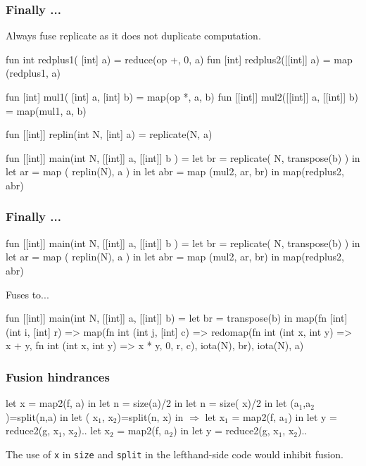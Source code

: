 \documentclass{beamer}
\renewcommand{\emph}[1]{\textcolor{structure}{#1}}
\newcommand{\emp}[1]{\textcolor{DikuRed}{ #1}}
\newcommand{\emphh}[1]{\textcolor{CosGreen}{ #1}}
\newcommand{\mymath}[1]{$ #1 $}
\newcommand{\myindx}[1]{_{#1}}
\begin{document}
\begin{frame}[fragile,t]
  \frametitle{Finally ... }

  Always fuse \emph{replicate} as it does not duplicate computation.

  \bigskip

\begin{colorcode}
fun   int    redplus1( [int]  a) = reduce(op +, 0, a)
fun  [int]   redplus2([[int]] a) = map   (redplus1, a)

fun  [int]   mul1( [int]  a,  [int]  b) = map(op *, a, b)
fun [[int]]  mul2([[int]] a, [[int]] b) = map(mul1, a, b)

fun [[int]]  replin(int N, [int] a) = replicate(N, a)

fun [[int]] main(int N, [[int]] a, [[int]] b ) =
    let br  = replicate( N, transpose(b) ) in
    let ar  = map      ( replin(N),    a ) in
    let abr = map  (mul2, ar, br)          in
        map(redplus2, abr)
\end{colorcode}
\end{frame}

\begin{frame}[fragile,t]
  \frametitle{Finally ... }

\begin{colorcode}
fun [[int]] main(int N, [[int]] a, [[int]] b ) =
    let br  = replicate( N, transpose(b) ) in
    let ar  = map      ( replin(N),    a ) in
    let abr = map  (mul2, ar, br)      in
        map(redplus2, abr)
\end{colorcode}

Fuses to...

\begin{colorcode}
fun [[int]] main(int N, [[int]] a, [[int]] b) =
  let br = transpose(b) in
  map(fn [int] (int i, [int] r) =>
      map(fn int (int j, [int] c) =>
          redomap(fn int (int x, int y) => x + y,
                  fn int (int x, int y) => x * y,
                  0, r, c),
          iota(N), br),
      iota(N), a)
\end{colorcode}

\end{frame}

\begin{frame}[fragile, t]
\frametitle{Fusion hindrances}

\begin{colorcode}
let \emphh{x} = map2(f, a)      in    let n = size(a)/2      in
let n = size(\emp{x})/2       in    let (a\mymath{\myindx{1}},a\mymath{\myindx{2}})=split(n,a) in
let (\emphh{x\mymath{\myindx{1}}},\emphh{x\mymath{\myindx{2}}})=split(n,\emp{x})  in \mymath{\Rightarrow} let \emphh{x\mymath{\myindx{1}}} = map2(f, a\mymath{\myindx{1}})   in
let y = reduce2(g,\emphh{x\mymath{\myindx{1}}},\emphh{x\mymath{\myindx{2}}})..    let \emphh{x\mymath{\myindx{2}}} = map2(f, a\mymath{\myindx{2}})   in
                              let y = reduce2(g,\emphh{x\mymath{\myindx{1}}},\emphh{x\mymath{\myindx{2}}})..
\end{colorcode}
The use of {\tt x} in {\tt size} and {\tt split} in the lefthand-side
code would inhibit fusion.
\end{frame}
\end{document}
